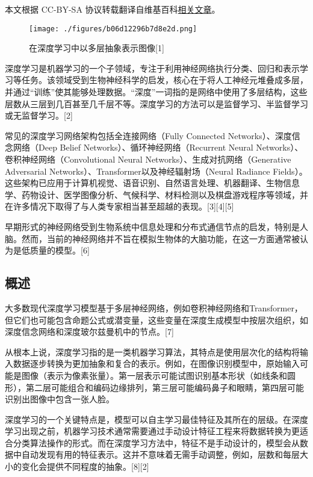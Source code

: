 
本文根据 CC-BY-SA 协议转载翻译自维基百科\href{https://en.wikipedia.org/wiki/Deep_learning}{相关文章}。

\begin{figure}[ht]
\centering
\texttt{[image: ./figures/b06d12296b7d8e2d.png]}
\caption{在深度学习中以多层抽象表示图像[1]} \label{fig_SDXX_1}
\end{figure}
深度学习是机器学习的一个子领域，专注于利用神经网络执行分类、回归和表示学习等任务。该领域受到生物神经科学的启发，核心在于将人工神经元堆叠成多层，并通过“训练”使其能够处理数据。“深度”一词指的是网络中使用了多层结构，这些层数从三层到几百甚至几千层不等。深度学习的方法可以是监督学习、半监督学习或无监督学习。[2]

常见的深度学习网络架构包括全连接网络（Fully Connected Networks）、深度信念网络（Deep Belief Networks）、循环神经网络（Recurrent Neural Networks）、卷积神经网络（Convolutional Neural Networks）、生成对抗网络（Generative Adversarial Networks）、Transformer以及神经辐射场（Neural Radiance Fields）。这些架构已应用于计算机视觉、语音识别、自然语言处理、机器翻译、生物信息学、药物设计、医学图像分析、气候科学、材料检测以及棋盘游戏程序等领域，并在许多情况下取得了与人类专家相当甚至超越的表现。[3][4][5]

早期形式的神经网络受到生物系统中信息处理和分布式通信节点的启发，特别是人脑。然而，当前的神经网络并不旨在模拟生物体的大脑功能，在这一方面通常被认为是低质量的模型。[6]
\subsection{概述}
大多数现代深度学习模型基于多层神经网络，例如卷积神经网络和Transformer，但它们也可能包含命题公式或潜变量，这些变量在深度生成模型中按层次组织，如深度信念网络和深度玻尔兹曼机中的节点。[7]

从根本上说，深度学习指的是一类机器学习算法，其特点是使用层次化的结构将输入数据逐步转换为更加抽象和复合的表示。例如，在图像识别模型中，原始输入可能是图像（表示为像素张量）。第一层表示可能试图识别基本形状（如线条和圆形），第二层可能组合和编码边缘排列，第三层可能编码鼻子和眼睛，第四层可能识别出图像中包含一张人脸。

深度学习的一个关键特点是，模型可以自主学习最佳特征及其所在的层级。在深度学习出现之前，机器学习技术通常需要通过手动设计特征工程来将数据转换为更适合分类算法操作的形式。而在深度学习方法中，特征不是手动设计的，模型会从数据中自动发现有用的特征表示。这并不意味着无需手动调整，例如，层数和每层大小的变化会提供不同程度的抽象。[8][2]

